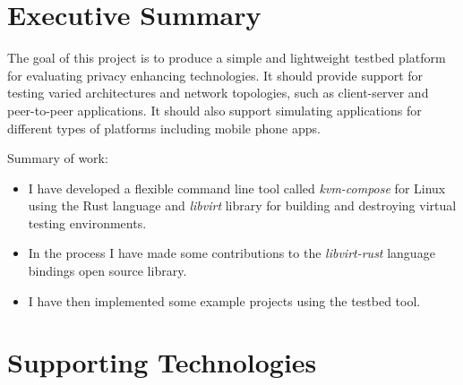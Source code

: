 \documentclass[
    author={Jacob Daniel Halsey},
    supervisor={Prof. Awais Rashid},
    degree={BSc},
    title={Building a Testbed for Evaluating Privacy Enhancing Technologies  (PETs)},
    subtitle={},
    type={software development},
    year={2021}
]{dissertation}
\begin{document}
\maketitle
\frontmatter
\makedecl
\tableofcontents

\chapter*{Executive Summary}

The goal of this project is to produce a simple and lightweight testbed platform for evaluating privacy enhancing
technologies.
It should provide support for testing varied architectures and network topologies, such as client-server and
peer-to-peer applications.
It should also support simulating applications for different types of platforms including mobile phone apps.

\vspace{1cm}

Summary of work:

\begin{itemize}
\item I have developed a flexible command line tool called \emph{kvm-compose} for Linux using the Rust
      language and \emph{libvirt} library for building and destroying virtual testing environments.
\item In the process I have made some contributions to the \emph{libvirt-rust} language
      bindings open source library.
\item I have then implemented some example projects using the testbed tool.
\end{itemize}

\chapter*{Supporting Technologies}
\label{chap:supporting_tech}
\end{document}
